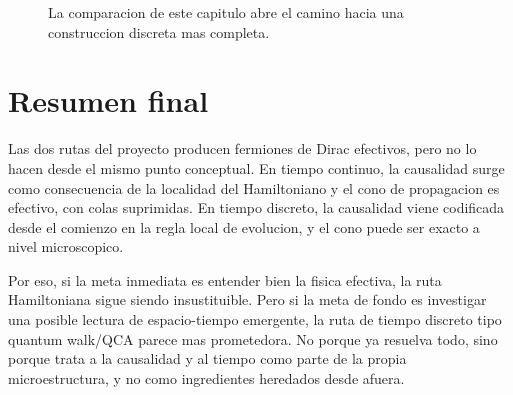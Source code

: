 \begin{figure}[h!]
\centering
{}
\caption{La comparacion de este capitulo abre el camino hacia una construccion discreta mas completa.}
\end{figure}

\section{Resumen final}
Las dos rutas del proyecto producen fermiones de Dirac efectivos, pero no lo hacen desde el mismo punto conceptual. En tiempo continuo, la causalidad surge como consecuencia de la localidad del Hamiltoniano y el cono de propagacion es efectivo, con colas suprimidas. En tiempo discreto, la causalidad viene codificada desde el comienzo en la regla local de evolucion, y el cono puede ser exacto a nivel microscopico.

Por eso, si la meta inmediata es entender bien la fisica efectiva, la ruta Hamiltoniana sigue siendo insustituible. Pero si la meta de fondo es investigar una posible lectura de espacio-tiempo emergente, la ruta de tiempo discreto tipo quantum walk/QCA parece mas prometedora. No porque ya resuelva todo, sino porque trata a la causalidad y al tiempo como parte de la propia microestructura, y no como ingredientes heredados desde afuera.
